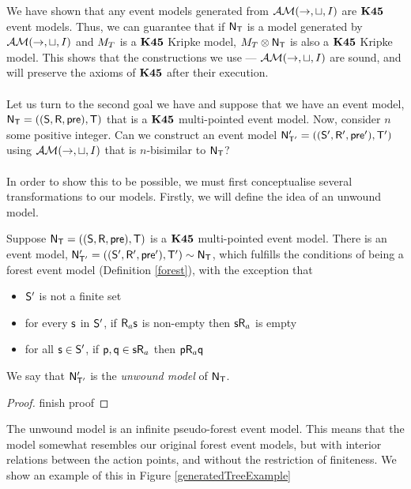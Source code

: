 We have shown that any event models generated from $\mathcal{AM}(\to,\sqcup, I)$ are
$\bf K45$ event models.
Thus, we can guarantee that if $\mathrm{\mathsf{N}}_\mathrm{\mathsf{T}}$ is a model generated by
$\mathcal{AM}(\to,\sqcup,I)$ and $M_T$ is a $\bf K45$ Kripke model, $M_T
\otimes \mathrm{\mathsf{N}}_\mathrm{\mathsf{T}}$ is also a $\bf K45$ Kripke model.
This shows that the constructions we use --- $\mathcal{AM}(\to, \sqcup, I)$ are
sound, and will preserve the axioms of $\bf K45$ after their execution.\\
\\
Let us turn to the second goal we have and suppose that we have an event model, $\mathrm{\mathsf{N}}_\mathrm{\mathsf{T}}
= ((\mathrm{\mathsf{S}},\mathrm{\mathsf{R}},\mathrm{\mathsf{pre}}),\mathrm{\mathsf{T}})$ that is a $\bf K45$ multi-pointed event model.
Now, consider $n$ some positive integer.
Can we construct an event model $\mathrm{\mathsf{N}}'_{\mathrm{\mathsf{T}}'} = ((\mathrm{\mathsf{S}}',\mathrm{\mathsf{R}}',\mathrm{\mathsf{pre}}'),\mathrm{\mathsf{T}}')$
using $\mathcal{AM}(\to,\sqcup,I)$ that is $n$-bisimilar to $\mathrm{\mathsf{N}}_\mathrm{\mathsf{T}}$?\\
\\
In order to show this to be possible, we must first conceptualise several
transformations to our models.
Firstly, we will define the idea of an unwound model.

\begin{lemma} \label{unwoundModel}
  Suppose $\mathrm{\mathsf{N}}_\mathrm{\mathsf{T}} = ((\mathrm{\mathsf{S}},\mathrm{\mathsf{R}},\mathrm{\mathsf{pre}}),\mathrm{\mathsf{T}})$ is a $\bf K45$ multi-pointed
  event model.
  There is an event model, $\mathrm{\mathsf{N}}'_{\mathrm{\mathsf{T}}'} = ((\mathrm{\mathsf{S}}',\mathrm{\mathsf{R}}',\mathrm{\mathsf{pre}}'),\mathrm{\mathsf{T}}') \sim
  \mathrm{\mathsf{N}}_\mathrm{\mathsf{T}}$, which fulfills the conditions of being a forest event model
  (Definition \ref{forest}), with the exception that
  \begin{itemize}
    \item $\mathrm{\mathsf{S}}'$ is not a finite set
    \item for every $\mathrm{\mathsf{s}}$ in $\mathrm{\mathsf{S}}'$, if $\mathrm{\mathsf{R}}_a \mathrm{\mathsf{s}}$ is non-empty then
    $\mathrm{\mathsf{s}} \mathrm{\mathsf{R}}_a$ is empty
    \item for all $\mathrm{\mathsf{s}} \in \mathrm{\mathsf{S}}'$, if $\mathrm{\mathsf{p}}, \mathrm{\mathsf{q}} \in \mathrm{\mathsf{s}} \mathrm{\mathsf{R}}_a$ then $\mathrm{\mathsf{p}}
    \mathrm{\mathsf{R}}_a \mathrm{\mathsf{q}}$
  \end{itemize}
  We say that $\mathrm{\mathsf{N}}'_{\mathrm{\mathsf{T}}'}$ is the {\em unwound model} of $\mathrm{\mathsf{N}}_\mathrm{\mathsf{T}}$.
\end{lemma}
\begin{proof}
  \FIXME finish proof
\end{proof}

The unwound model is an infinite pseudo-forest event model.
This means that the model somewhat resembles our original forest event models,
but with interior relations between the action points, and without the
restriction of finiteness.
We show an example of this in Figure \ref{generatedTreeExample}


